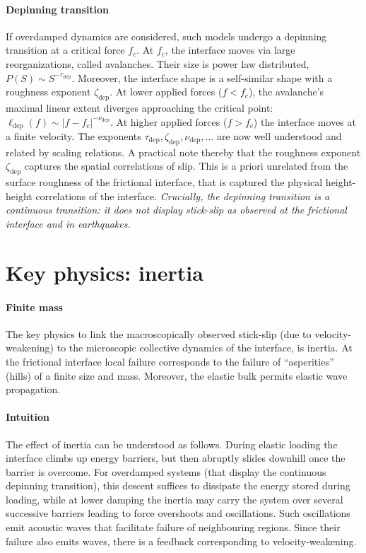 \documentclass{goose-article}
\begin{document}
\paragraph{Depinning transition}

If overdamped dynamics are considered, such models undergo a depinning transition at a critical force $f_c$.
At $f_c$, the interface moves via large reorganizations, called avalanches.
Their size is power law distributed, $P(S) \sim S^{-\tau_\mathrm{dep}}$.
Moreover, the interface shape is a self-similar shape with a roughness exponent $\zeta_\mathrm{dep}$.
At lower applied forces ($f < f_c$), the avalanche's maximal linear extent diverges approaching the critical point: $\ell_\mathrm{dep} (f) \sim |f - f_c|^{-\nu_\mathrm{dep}}$.
At higher applied forces ($f > f_c$) the interface moves at a finite velocity.
The exponents $\tau_\mathrm{dep}, \zeta_\mathrm{dep}, \nu_\mathrm{dep}, \ldots$ are now well understood and related by scaling relations.
A practical note thereby that the roughness exponent $\zeta_\mathrm{dep}$ captures the spatial correlations of slip.
This is a priori unrelated from the surface roughness of the frictional interface, that is captured the physical height-height correlations of the interface.
\emph{Crucially, the depinning transition is a continuous transition: it does not display stick-slip as observed at the frictional interface and in earthquakes.}

\section{Key physics: inertia}

\paragraph{Finite mass}

The key physics to link the macroscopically observed stick-slip (due to velocity-weakening) to the microscopic collective dynamics of the interface, is inertia.
At the frictional interface local failure corresponds to the failure of ``asperities'' (hills) of a finite size and mass.
Moreover, the elastic bulk permits elastic wave propagation.

\paragraph{Intuition}

The effect of inertia can be understood as follows.
During elastic loading the interface climbs up energy barriers, but then abruptly slides downhill once the barrier is overcome.
For overdamped systems (that display the continuous depinning transition), this descent suffices to dissipate the energy stored during loading, while at lower damping the inertia may carry the system over several successive barriers leading to force overshoots and oscillations.
Such oscillations emit acoustic waves that facilitate failure of neighbouring regions.
Since their failure also emits waves, there is a feedback corresponding to velocity-weakening.
\end{document}
